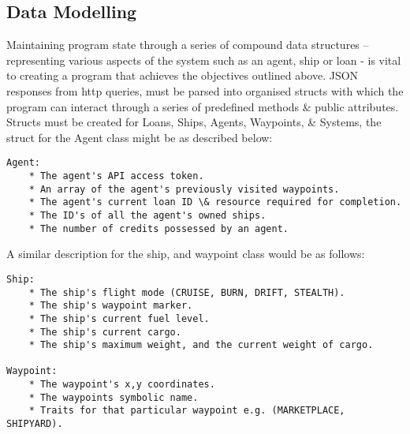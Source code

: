 \subsection{Data Modelling}
Maintaining program state through a series of compound data structures – representing various aspects of the system such as an agent, ship or loan - is vital to creating a program that achieves the objectives outlined above. JSON responses from http queries, must be parsed into organised structs with which the program can interact through a series of predefined methods \& public attributes. Structs must be created for Loans, Ships, Agents, Waypoints, \& Systems, the struct for the Agent class might be as described below:
\begin{lstlisting}
Agent:
    * The agent's API access token.
    * An array of the agent's previously visited waypoints.
    * The agent's current loan ID \& resource required for completion.
    * The ID's of all the agent's owned ships.
    * The number of credits possessed by an agent.
\end{lstlisting}
A similar description for the ship, and waypoint class would be as follows:
\begin{lstlisting}
Ship:
    * The ship's flight mode (CRUISE, BURN, DRIFT, STEALTH).
    * The ship's waypoint marker.
    * The ship's current fuel level.
    * The ship's current cargo.
    * The ship's maximum weight, and the current weight of cargo.

Waypoint:
    * The waypoint's x,y coordinates.
    * The waypoints symbolic name.
    * Traits for that particular waypoint e.g. (MARKETPLACE, SHIPYARD).
\end{lstlisting}